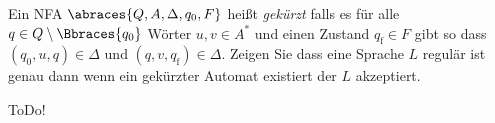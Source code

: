 
\begin{exercise}

Ein NFA $\abraces{Q, A, \Delta, q_0, F}$ heißt \textit{gekürzt} falls es für alle $q \in Q \setminus \Bbraces{q_0}$ Wörter $u, v \in A^\ast$ und einen Zustand $q_\mathrm{f} \in F$ gibt so dass $(q_0, u, q) \in \Delta$ und $(q, v, q_\mathrm{f}) \in \Delta$.
Zeigen Sie dass eine Sprache $L$ regulär ist genau dann wenn ein gekürzter Automat existiert der $L$ akzeptiert.

\end{exercise}


\begin{solution}

ToDo!

\end{solution}

